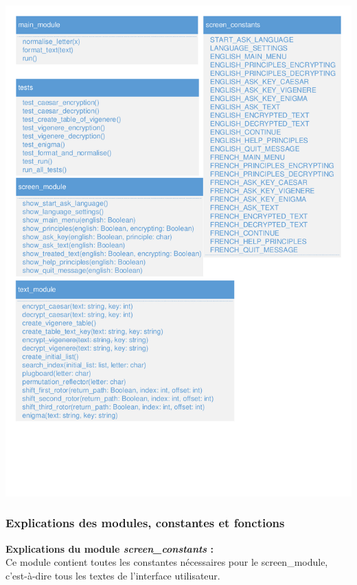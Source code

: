 \documentclass[a4paper,12pt,abstracton,titlepage]{scrartcl}
\begin{document}
{\begin{minipage}[c]{\textwidth}
\centering
    \includegraphics[width=\textwidth, trim=1mm 40mm 1mm 1mm, clip]{./Diagrammes/diagrammeDeStructure_main_modules.pdf}
    \label{img:structure}
\end{minipage}


\newpage
\subsubsection{Explications des modules, constantes et fonctions}
\textbf{Explications du module \textit{screen\_constants} :}\\
Ce module contient toutes les constantes nécessaires pour le screen\_module, c'est-à-dire tous les textes de l'interface utilisateur.
\vspace{0.3cm}

}
\end{document}
